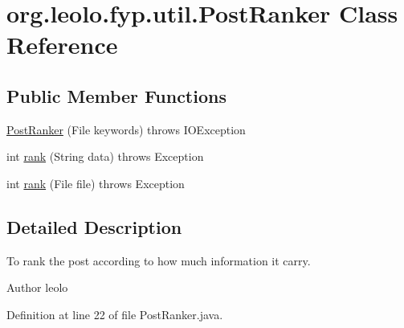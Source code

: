 \hypertarget{classorg_1_1leolo_1_1fyp_1_1util_1_1_post_ranker}{\section{org.\-leolo.\-fyp.\-util.\-Post\-Ranker Class Reference}
\label{classorg_1_1leolo_1_1fyp_1_1util_1_1_post_ranker}
}
\subsection*{Public Member Functions}
\begin{DoxyCompactItemize}
\item 
\hyperlink{classorg_1_1leolo_1_1fyp_1_1util_1_1_post_ranker_a16c051c84b31197646e6f1bf04f2af37}{Post\-Ranker} (File keywords)  throws I\-O\-Exception 
\item 
int \hyperlink{classorg_1_1leolo_1_1fyp_1_1util_1_1_post_ranker_af078235d7250cc9448b4a3dbfb8fe140}{rank} (String data)  throws Exception 
\item 
int \hyperlink{classorg_1_1leolo_1_1fyp_1_1util_1_1_post_ranker_a26d9eb9fee0ae8f97e79a1e33493476c}{rank} (File file)  throws Exception 
\end{DoxyCompactItemize}


\subsection{Detailed Description}
To rank the post according to how much information it carry. \begin{DoxyAuthor}{Author}
leolo 
\end{DoxyAuthor}


Definition at line 22 of file Post\-Ranker.\-java.



